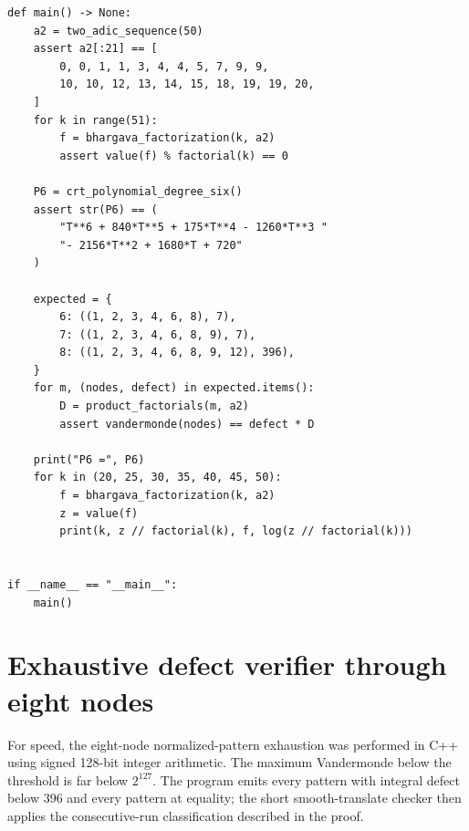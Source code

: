 \documentclass[11pt,oneside]{article}
\theoremstyle{definition}
\theoremstyle{remark}
\begin{document}
\begin{lstlisting}[style=pythonstyle]
def main() -> None:
    a2 = two_adic_sequence(50)
    assert a2[:21] == [
        0, 0, 1, 1, 3, 4, 4, 5, 7, 9, 9,
        10, 10, 12, 13, 14, 15, 18, 19, 19, 20,
    ]
    for k in range(51):
        f = bhargava_factorization(k, a2)
        assert value(f) % factorial(k) == 0

    P6 = crt_polynomial_degree_six()
    assert str(P6) == (
        "T**6 + 840*T**5 + 175*T**4 - 1260*T**3 "
        "- 2156*T**2 + 1680*T + 720"
    )

    expected = {
        6: ((1, 2, 3, 4, 6, 8), 7),
        7: ((1, 2, 3, 4, 6, 8, 9), 7),
        8: ((1, 2, 3, 4, 6, 8, 9, 12), 396),
    }
    for m, (nodes, defect) in expected.items():
        D = product_factorials(m, a2)
        assert vandermonde(nodes) == defect * D

    print("P6 =", P6)
    for k in (20, 25, 30, 35, 40, 45, 50):
        f = bhargava_factorization(k, a2)
        z = value(f)
        print(k, z // factorial(k), f, log(z // factorial(k)))


if __name__ == "__main__":
    main()
\end{lstlisting}

\section{Exhaustive defect verifier through eight nodes}
\label{app:defect-code}

For speed, the eight-node normalized-pattern exhaustion was performed in C++ using signed
128-bit integer arithmetic.  The maximum Vandermonde below the threshold is far below
\(2^{127}\).  The program emits every pattern with integral defect below \(396\) and every
pattern at equality; the short smooth-translate checker then applies the consecutive-run
classification described in the proof.
\end{document}
